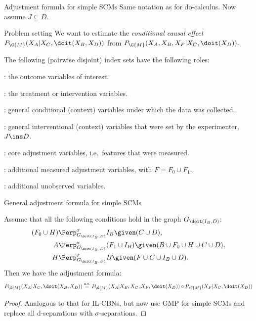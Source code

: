 \begin{frame}{Adjustment formula for simple SCMs}
Same notation as for do-calculus. Now assume $J \subseteq D$.
\begin{block}{Problem setting}
We want to estimate the \emph{conditional causal effect}
$P_{\C{M}}(X_A|X_C,\doit(X_B,X_D))$
from
$P_{\C{M}}(X_A,X_B,X_F|X_C,\doit(X_D)).$
\end{block}
The following (pairwise disjoint) index sets have the following roles:\\
\begin{description}\small
  \item[$A$]: the outcome variables of interest.
  \item[$B$]: the treatment or intervention variables.
  \item[$C$]: general conditional (context) variables under which the data was collected.
  \item[$D$]: general interventional (context) variables that were set by the experimenter, $J \ins D$.
  \item[$F_0$]: core adjustment variables, i.e.\ features that were measured.
  \item[$F_1$]: additional measured adjustment variables, with $F = F_0 \cup F_1$.
  \item[$H$]: additional unobserved variables.
\end{description}
\end{frame}

\begin{frame}{General adjustment formula for simple SCMs}
  \begin{Thm}
    Assume that all the following conditions hold in the graph $G_{\doit(I_B,D)}$:
    \begin{align}
        (F_0 \cup H) & \Perp^\sigma_{G_{\doit(I_B,D)}} I_B \given (C \cup D), \\
        A & \Perp^\sigma_{G_{\doit(I_B,D)}} (F_1 \cup I_B) \given (B \cup F_0 \cup H \cup C \cup D), \\
                      H &\Perp^\sigma_{G_{\doit(I_B,D)}} B \given (F \cup C \cup  I_B \cup D).
    \end{align}
Then we have the adjustment formula:\small
    \[ P_{\C{M}}(X_A|X_C,\doit(X_B,X_D)) \stackrel{\text{a.s.}}{=}
    P_{\C{M}}(X_A|X_B,X_C,X_F,\doit(X_D)) \circ P_{\C{M}}(X_F|X_C,\doit(X_D))
\]
\end{Thm}
\begin{proof}
  Analogous to that for IL-CBNs, but now use GMP for simple SCMs and replace all d-separations with $\sigma$-separations.
\end{proof}

\end{frame}

